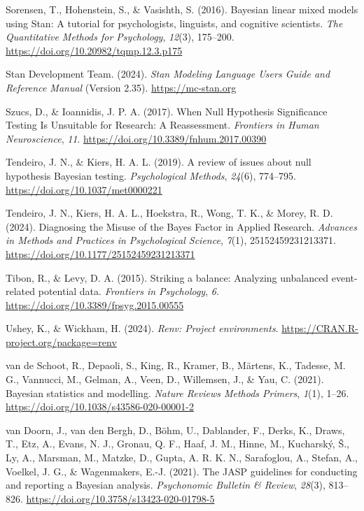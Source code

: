\documentclass[
  doc,12pt,floatsintext]{apa7}
\newlength{\cslhangindent}
\newenvironment{CSLReferences}[2] %
 {\begin{list}{}{%
  \setlength{\itemindent}{0pt}
  \setlength{\leftmargin}{0pt}
  \setlength{\parsep}{0pt}
  \ifodd #1
   \setlength{\leftmargin}{\cslhangindent}
   \setlength{\itemindent}{-1\cslhangindent}
  \fi
  \setlength{\itemsep}{#2\baselineskip}}}
 {\end{list}}
\begin{document}
\begin{CSLReferences}{1}{0}
Sorensen, T., Hohenstein, S., \& Vasishth, S. (2016). Bayesian linear mixed models using {Stan}: {A} tutorial for psychologists, linguists, and cognitive scientists. \emph{The Quantitative Methods for Psychology}, \emph{12}(3), 175--200. \url{https://doi.org/10.20982/tqmp.12.3.p175}

Stan Development Team. (2024). \emph{Stan {Modeling Language Users Guide} and {Reference Manual}} (Version 2.35). \url{https://mc-stan.org}

Szucs, D., \& Ioannidis, J. P. A. (2017). When {Null Hypothesis Significance Testing Is Unsuitable} for {Research}: {A Reassessment}. \emph{Frontiers in Human Neuroscience}, \emph{11}. \url{https://doi.org/10.3389/fnhum.2017.00390}

Tendeiro, J. N., \& Kiers, H. A. L. (2019). A review of issues about null hypothesis {Bayesian} testing. \emph{Psychological Methods}, \emph{24}(6), 774--795. \url{https://doi.org/10.1037/met0000221}

Tendeiro, J. N., Kiers, H. A. L., Hoekstra, R., Wong, T. K., \& Morey, R. D. (2024). Diagnosing the {Misuse} of the {Bayes Factor} in {Applied Research}. \emph{Advances in Methods and Practices in Psychological Science}, \emph{7}(1), 25152459231213371. \url{https://doi.org/10.1177/25152459231213371}

Tibon, R., \& Levy, D. A. (2015). Striking a balance: Analyzing unbalanced event-related potential data. \emph{Frontiers in Psychology}, \emph{6}. \url{https://doi.org/10.3389/fpsyg.2015.00555}

Ushey, K., \& Wickham, H. (2024). \emph{Renv: Project environments}. \url{https://CRAN.R-project.org/package=renv}

van de Schoot, R., Depaoli, S., King, R., Kramer, B., Märtens, K., Tadesse, M. G., Vannucci, M., Gelman, A., Veen, D., Willemsen, J., \& Yau, C. (2021). Bayesian statistics and modelling. \emph{Nature Reviews Methods Primers}, \emph{1}(1), 1--26. \url{https://doi.org/10.1038/s43586-020-00001-2}

van Doorn, J., van den Bergh, D., Böhm, U., Dablander, F., Derks, K., Draws, T., Etz, A., Evans, N. J., Gronau, Q. F., Haaf, J. M., Hinne, M., Kucharský, Š., Ly, A., Marsman, M., Matzke, D., Gupta, A. R. K. N., Sarafoglou, A., Stefan, A., Voelkel, J. G., \& Wagenmakers, E.-J. (2021). The {JASP} guidelines for conducting and reporting a {Bayesian} analysis. \emph{Psychonomic Bulletin \& Review}, \emph{28}(3), 813--826. \url{https://doi.org/10.3758/s13423-020-01798-5}


\end{CSLReferences}
\end{document}
